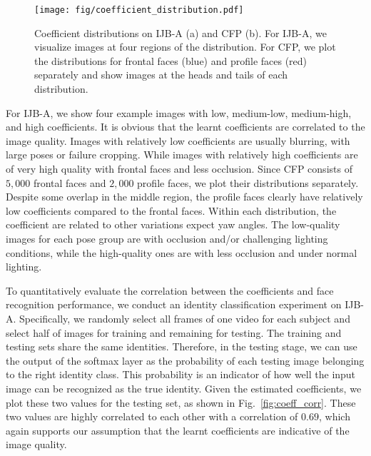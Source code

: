 \documentclass[10pt,journal,compsoc]{IEEEtran}
\begin{document}
\begin{figure*}[t!]
\begin{center}
\texttt{[image: fig/coefficient\_distribution.pdf]}
\end{center}
\vspace{-1mm}
   \caption{\small Coefficient distributions on IJB-A (a) and CFP (b). For IJB-A, we visualize images at four regions of the distribution. For CFP, we plot the distributions for frontal faces (blue) and profile faces (red) separately and show images at the heads and tails of each distribution. }
\label{fig:coeff}
\end{figure*}For IJB-A, we show four example images with low, medium-low, medium-high, and high coefficients. 
It is obvious that the learnt coefficients are correlated to the image quality. 
Images with relatively low coefficients are usually blurring, with large poses or failure cropping. 
While images with relatively high coefficients are of very high quality with frontal faces and less occlusion. 
Since CFP consists of $5,000$ frontal faces and $2,000$ profile faces, we plot their distributions separately.
Despite some overlap in the middle region, the profile faces clearly have relatively low coefficients compared to the frontal faces. 
Within each distribution, the coefficient are related to other variations expect yaw angles. 
The low-quality images for each pose group are with occlusion and/or challenging lighting conditions, while the high-quality ones are with less occlusion and under normal lighting. 

To quantitatively evaluate the correlation between the coefficients and face recognition performance, we conduct an identity classification experiment on IJB-A.  
Specifically, we randomly select all frames of one video for each subject and select half of images for training and remaining for testing.
%
The training and testing sets share the same identities.
Therefore, in the testing stage, we can use the output of the softmax layer as the probability of each testing image belonging to the right identity class. 
This probability is an indicator of how well the input image can be recognized as the true identity.  
Given the estimated coefficients, we plot these two values for the testing set, as shown in Fig.~\ref{fig:coeff_corr}. 
These two values are highly correlated to each other with a correlation of $0.69$, which again supports our assumption that the learnt coefficients are indicative of the image quality. 
\end{document}
